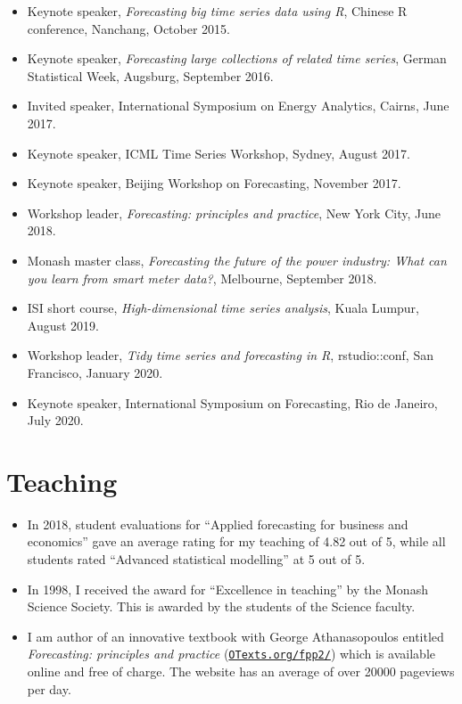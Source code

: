 \documentclass[10pt,a4paper,]{article}
\providecommand{\tightlist}{%
  \setlength{\itemsep}{0pt}\setlength{\parskip}{0pt}}
\begin{document}
\begin{itemize}
\item
  Keynote speaker, \emph{Forecasting big time series data using R}, Chinese R conference, Nanchang, October 2015.
\item
  Keynote speaker, \emph{Forecasting large collections of related time series}, German Statistical Week, Augsburg, September 2016.
\item
  Invited speaker, International Symposium on Energy Analytics, Cairns, June 2017.
\item
  Keynote speaker, ICML Time Series Workshop, Sydney, August 2017.
\item
  Keynote speaker, Beijing Workshop on Forecasting, November 2017.
\item
  Workshop leader, \emph{Forecasting: principles and practice}, New York City, June 2018.
\item
  Monash master class, \emph{Forecasting the future of the power industry: What can you learn from smart meter data?}, Melbourne, September 2018.
\item
  ISI short course, \emph{High-dimensional time series analysis}, Kuala Lumpur, August 2019.
\item
  Workshop leader, \emph{Tidy time series and forecasting in R}, rstudio::conf, San Francisco, January 2020.
\item
  Keynote speaker, International Symposium on Forecasting, Rio de Janeiro, July 2020.
\end{itemize}

\hypertarget{teaching}{%
\section{Teaching}\label{teaching}}

\begin{itemize}
\tightlist
\item
  In 2018, student evaluations for ``Applied forecasting for business and economics'' gave an average rating for my teaching of 4.82 out of 5, while all students rated ``Advanced statistical modelling'' at 5 out of 5.
\item
  In 1998, I received the award for ``Excellence in teaching'' by the Monash Science Society. This is awarded by the students of the Science faculty.
\item
  I am author of an innovative textbook with George Athanasopoulos entitled \emph{Forecasting: principles and practice} (\href{https://OTexts.org/fpp2}{\texttt{OTexts.org/fpp2/}}) which is available online and free of charge. The website has an average of over 20000 pageviews per day.
\end{itemize}
\end{document}
